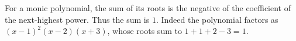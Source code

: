 For a monic polynomial, the sum of its roots is the negative of the coefficient of the next-highest power. Thus the sum is $\boxed1$. Indeed the polynomial factors as $(x-1)^2(x-2)(x+3)$, whose roots sum to $1+1+2-3=1$.
